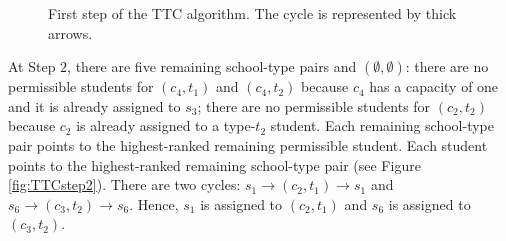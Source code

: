 \documentclass[12pt]{amsart}
\theoremstyle{remark}
\begin{document}
\begin{figure}[!htb]
\begin{center}
\end{center}
  \caption{First step of the TTC algorithm. The cycle is represented by thick arrows.}
  \label{fig:TTCstep1}
\end{figure}
At Step $2$, there are five remaining school-type pairs and $(\emptyset,\emptyset)$: there are no permissible students for $(c_4,t_1)$ and $(c_4,t_2)$ because $c_4$ has a
capacity of one and it is already assigned to $s_3$; there are no permissible students for $(c_2,t_2)$ because $c_2$ is already assigned to a type-$t_2$ student.
Each remaining school-type pair points to the highest-ranked remaining permissible student. Each student points to the highest-ranked remaining school-type pair
(see Figure \ref{fig:TTCstep2}). There are two cycles: $s_1 \rightarrow (c_2,t_1) \rightarrow s_1$ and $s_6 \rightarrow (c_3,t_2) \rightarrow s_6$.
Hence, $s_1$ is assigned to $(c_2,t_1)$ and $s_6$ is assigned to $(c_3,t_2)$.
\end{document}
